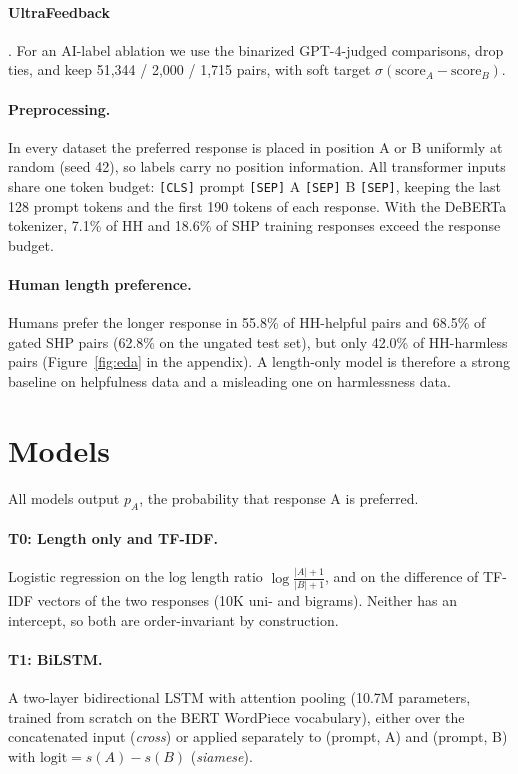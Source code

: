 \documentclass[11pt]{article}
\newcommand{\pa}{p_{A}}
\begin{document}
\paragraph{UltraFeedback} \citep{cui2024ultrafeedback}. For an AI-label ablation we use the binarized GPT-4-judged comparisons, drop ties, and keep 51,344 / 2,000 / 1,715 pairs, with soft target $\sigma(\text{score}_A-\text{score}_B)$.

\paragraph{Preprocessing.} In every dataset the preferred response is placed in position A or B uniformly at random (seed 42), so labels carry no position information. All transformer inputs share one token budget: \texttt{[CLS]} prompt \texttt{[SEP]} A \texttt{[SEP]} B \texttt{[SEP]}, keeping the last 128 prompt tokens and the first 190 tokens of each response. With the DeBERTa tokenizer, 7.1\% of HH and 18.6\% of SHP training responses exceed the response budget.

\paragraph{Human length preference.} Humans prefer the longer response in 55.8\% of HH-helpful pairs and 68.5\% of gated SHP pairs (62.8\% on the ungated test set), but only 42.0\% of HH-harmless pairs (Figure~\ref{fig:eda} in the appendix). A length-only model is therefore a strong baseline on helpfulness data and a misleading one on harmlessness data.

\section{Models}
\label{sec:models}

All models output $\pa$, the probability that response A is preferred.

\paragraph{T0: Length only and TF-IDF.} Logistic regression on the log length ratio $\log\frac{|A|+1}{|B|+1}$, and on the difference of TF-IDF vectors of the two responses (10K uni- and bigrams). Neither has an intercept, so both are order-invariant by construction.

\paragraph{T1: BiLSTM.} A two-layer bidirectional LSTM \citep{hochreiter1997long} with attention pooling (10.7M parameters, trained from scratch on the BERT WordPiece vocabulary), either over the concatenated input (\emph{cross}) or applied separately to (prompt, A) and (prompt, B) with $\text{logit}=s(A)-s(B)$ (\emph{siamese}).
\end{document}

